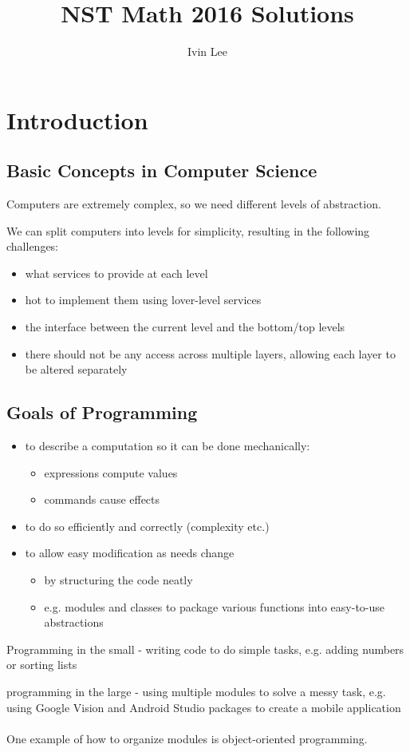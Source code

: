 \documentclass[12pt,a4paper]{article} %
\author{Ivin Lee}
\title{NST Math 2016 Solutions}
\begin{document}
\section{Introduction}
\subsection{Basic Concepts in Computer Science}
Computers are extremely complex, so we need different levels of abstraction.

We can split computers into levels for simplicity, resulting in the following challenges:
\begin{itemize}
\item what services to provide at each level
\item hot to implement them using lover-level services
\item the interface between the current level and the bottom/top levels
\item there should not be any access across multiple layers, allowing each layer to be altered separately
\end{itemize}
\subsection{Goals of Programming}
\begin{itemize}
\item to describe a computation so it can be done mechanically:
	\begin{itemize}
	\item expressions compute values
	\item commands cause effects
	\end{itemize}
\item to do so efficiently and correctly (complexity etc.)
\item to allow easy modification as needs change
	\begin{itemize}
	\item by structuring the code neatly 
	\item e.g. modules and classes to package various functions into easy-to-use abstractions
	\end{itemize}
\end{itemize}
Programming in the small - writing code to do simple tasks, e.g. adding numbers or sorting lists

programming in the large - using multiple modules to solve a messy task, e.g. using Google Vision and Android Studio packages to create a mobile application
\\\\
One example of how to organize modules is object-oriented programming.
\end{document}
